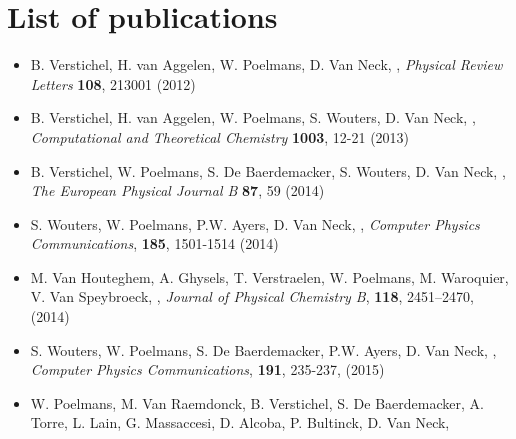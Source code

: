 \chapter{List of publications}\label{app-papers}

\begin{itemize}
  \item B. Verstichel, H. van Aggelen, W. Poelmans, D. Van Neck, 
    , 
    \textit{Physical Review Letters} \textbf{108}, 213001 (2012)
  \item B. Verstichel, H. van Aggelen, W. Poelmans, S. Wouters, D. Van Neck, 
    , 
    \textit{Computational and Theoretical Chemistry} \textbf{1003}, 12-21 (2013)
  \item B. Verstichel, W. Poelmans, S. De Baerdemacker, S. Wouters, D. Van Neck, 
      ,
      \textit{The European Physical Journal B} \textbf{87}, 59 (2014)
  \item  S. Wouters, W. Poelmans, P.W. Ayers, D. Van Neck,
      , 
      \textit{Computer Physics Communications}, \textbf{185}, 1501-1514 (2014)
  \item M. Van Houteghem, A. Ghysels, T. Verstraelen, W. Poelmans, M. Waroquier, V. Van Speybroeck,
      ,
      \textit{Journal of Physical Chemistry B}, \textbf{118}, 2451–2470, (2014)
  \item S. Wouters, W. Poelmans, S. De Baerdemacker, P.W. Ayers, D. Van Neck,
      ,
      \textit{Computer Physics Communications}, \textbf{191}, 235-237, (2015)
  \item W. Poelmans, M. Van Raemdonck, B. Verstichel, S. De Baerdemacker, A. Torre, L. Lain, G. Massaccesi, D. Alcoba, P. Bultinck,  D. Van Neck, 

\end{itemize}
